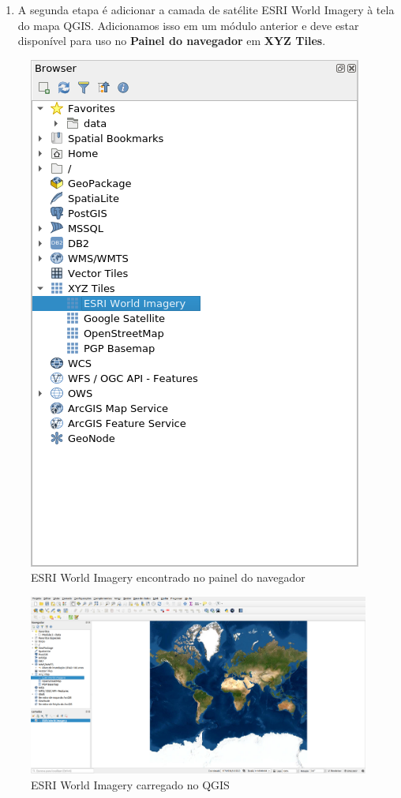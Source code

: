 \documentclass[
  portuguese,
]{krantz}
\providecommand{\tightlist}{%
  \setlength{\itemsep}{0pt}\setlength{\parskip}{0pt}}
\begin{document}
\begin{enumerate}
\def\labelenumi{\arabic{enumi}.}
\setcounter{enumi}{3}
\tightlist
\item
  A segunda etapa é adicionar a camada de satélite ESRI World Imagery à tela do mapa QGIS. Adicionamos isso em um módulo anterior e deve estar disponível para uso no \textbf{Painel do navegador} em \textbf{XYZ Tiles}.
\end{enumerate}

\begin{figure}
\centering
\includegraphics{media/modulo7/xyz-2.png}
\caption{ESRI World Imagery encontrado no painel do navegador}
\end{figure}

\begin{figure}
\centering
\includegraphics{media/modulo7/xyz-3.png}
\caption{ESRI World Imagery carregado no QGIS}
\end{figure}
\end{document}
